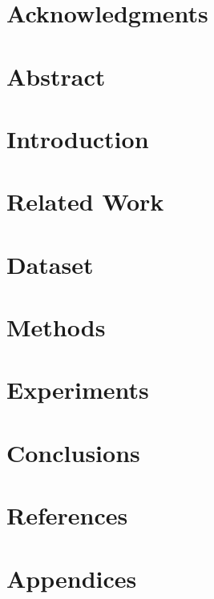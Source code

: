 \documentclass[12pt]{article}
\begin{document}

\restoregeometry

\section*{Acknowledgments}

\pagebreak

\setcounter{tocdepth}{5}
\tableofcontents
\pagebreak

\listoffigures
\listoftables
\pagebreak

\justify

\section*{Abstract}

\pagebreak

\section{Introduction}


\section{Related Work}


\section{Dataset}


\section{Methods}


\section{Experiments}


\section{Conclusions}


\section{References}
\label{sec:ref}
\printbibliography[heading=none]

\section{Appendices}

\end{document}
